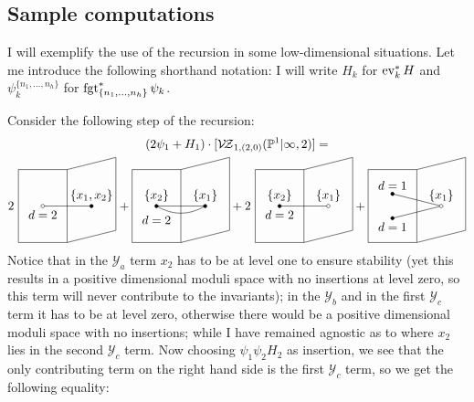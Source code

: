 \subsection{Sample computations} I will exemplify the use of the recursion in some low-dimensional situations. Let me introduce the following shorthand notation: I will write $H_k$ for $\operatorname{ev}_k^* H$ and $\psi_k^{\{n_1,\ldots,n_h\}}$ for $\operatorname{fgt}_{\{n_1,\ldots,n_h\}}^*\psi_k$.
\begin{ex}
 Consider the following step of the recursion:
 \begin{multline*} (2\psi_1+H_1)\cdot [\VZ{(2,0)}{\PP^1|\infty}{2}]=\\ 2\ {\tikz[baseline=-3pt,scale=.7]{
\draw (2,0) node[above]{$\{x_1,x_2\}$} -- (0,0)node[below]{$d=2$};
\draw (2,0) circle(2pt)[fill=black];
\draw (0,0) circle(2pt)[fill=white];
\draw (-1,1.5) -- (1,1.5) -- (1,-1.5) -- (-1,-1.5) -- (-1,1.5);
\draw (1,1.5) -- (3,2) -- (3,-1) -- (1,-1.5);
}}+
{\tikz[baseline=-3pt,scale=.7]{
\draw (2,0) node[above]{$\{x_1\}$} to[out=210,in=-30] (0,0)node[above]{$\{x_2\}$}node[below=.15cm]{$d=2$} (2,0) -- (0,0);
\draw (2,0) circle(2pt)[fill=black];
\draw (0,0) circle(2pt)[fill=black];
\draw (-1,1.5) -- (1,1.5) -- (1,-1.5) -- (-1,-1.5) -- (-1,1.5);
\draw (1,1.5) -- (3,2) -- (3,-1) -- (1,-1.5);
}}+
2\ {\tikz[baseline=-3pt,scale=.7]{
\draw (2,0) node[above]{$\{x_1\}$} -- (0,0)node[above]{$\{x_2\}$}node[below]{$d=2$};
\draw (2,0) circle(2pt)[fill=white];
\draw (0,0) circle(2pt)[fill=black];
\draw (-1,1.5) -- (1,1.5) -- (1,-1.5) -- (-1,-1.5) -- (-1,1.5);
\draw (1,1.5) -- (3,2) -- (3,-1) -- (1,-1.5);
}}+
{\tikz[baseline=-3pt,scale=.7]{
\draw (2,0) node[above]{$\{x_1\}$} -- (0,.5)node[above]{$d=1$} (2,0)--(0,-.5)node[below]{$d=1$};
\draw (2,0) circle(2pt)[fill=white];
\draw (0,0.5) circle(2pt)[fill=black] (0,-0.5) circle(2pt)[fill=black];
\draw (-1,1.5) -- (1,1.5) -- (1,-1.5) -- (-1,-1.5) -- (-1,1.5);
\draw (1,1.5) -- (3,2) -- (3,-1) -- (1,-1.5);
}}
\end{multline*}
Notice that in the $\mathcal Y_a$ term $x_2$ has to be at level one to ensure stability (yet this results in a positive dimensional moduli space with no insertions at level zero, so this term will never contribute to the invariants); in the $\mathcal Y_b$ and in the first $\mathcal Y_c$ term it has to be at level zero, otherwise there would be a positive dimensional moduli space with no insertions; while I have remained agnostic as to where $x_2$ lies in the second $\mathcal Y_c$ term. Now choosing $\psi_1\psi_2H_2$ as insertion, we see that the only contributing term on the right hand side is the first $\mathcal Y_c$ term, so we get the following equality:

\end{ex}
